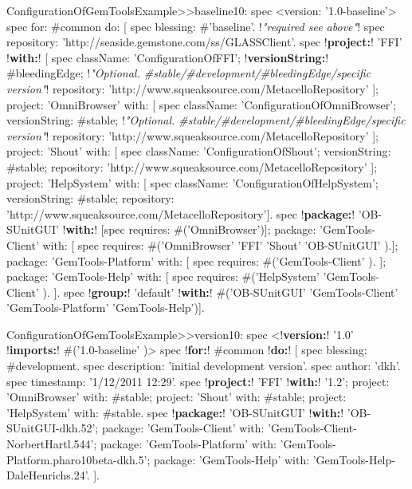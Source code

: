 \documentclass[a4paper,10pt,twoside]{book}
\begin{document}
\begin{footnotesize}
\begin{code}{}
ConfigurationOfGemToolsExample>>baseline10: spec
  <version: '1.0-baseline'>
  spec for: #common do: [
     spec blessing: #'baseline'.                 !\emph{"required see above"}!
     spec repository: 'http://seaside.gemstone.com/ss/GLASSClient'.
     spec
        !\textbf{project:}! 'FFI' !\textbf{with:}! [
          spec
             className: 'ConfigurationOfFFI';
             !\textbf{versionString:}! #bleedingEdge;					!\emph{"Optional. \#stable/\#development/\#bleedingEdge/specific version"}!
             repository: 'http://www.squeaksource.com/MetacelloRepository' ];
        project: 'OmniBrowser' with: [
          spec
             className: 'ConfigurationOfOmniBrowser';
             versionString: #stable;									!\emph{"Optional. \#stable/\#development/\#bleedingEdge/specific version"}!
             repository: 'http://www.squeaksource.com/MetacelloRepository' ];
        project: 'Shout' with: [
          spec
             className: 'ConfigurationOfShout';
             versionString: #stable;
             repository: 'http://www.squeaksource.com/MetacelloRepository' ];
        project: 'HelpSystem' with: [
          spec
             className: 'ConfigurationOfHelpSystem';
             versionString: #stable;
             repository: 'http://www.squeaksource.com/MetacelloRepository'].
     spec
        !\textbf{package:}! 'OB-SUnitGUI' !\textbf{with:}! [spec requires: #('OmniBrowser')];
        package: 'GemTools-Client' with: [ spec requires: #('OmniBrowser' 'FFI' 'Shout' 'OB-SUnitGUI' ).];
        package: 'GemTools-Platform' with: [ spec requires: #('GemTools-Client' ). ];
        package: 'GemTools-Help' with: [
          spec requires: #('HelpSystem' 'GemTools-Client' ). ].
     spec !\textbf{group:}! 'default' !\textbf{with:}! #('OB-SUnitGUI' 'GemTools-Client' 'GemTools-Platform' 'GemTools-Help')].
\end{code}
\end{footnotesize}







\begin{footnotesize}
\begin{code}{}
ConfigurationOfGemToolsExample>>version10: spec
     <!\textbf{version:}! '1.0' !\textbf{imports:}! #('1.0-baseline' )>
     spec !\textbf{for:}! #common !\textbf{do:}! [
          spec blessing: #development.
          spec description: 'initial development version'.
          spec author: 'dkh'.
          spec timestamp: '1/12/2011 12:29'.
     spec
          !\textbf{project:}! 'FFI' !\textbf{with:}! '1.2';
          project: 'OmniBrowser' with: #stable;
          project: 'Shout' with: #stable;
          project: 'HelpSystem' with: #stable.
     spec
          !\textbf{package:}! 'OB-SUnitGUI' !\textbf{with:}! 'OB-SUnitGUI-dkh.52';
          package: 'GemTools-Client' with: 'GemTools-Client-NorbertHartl.544';
          package: 'GemTools-Platform' with: 'GemTools-Platform.pharo10beta-dkh.5';
          package: 'GemTools-Help' with: 'GemTools-Help-DaleHenrichs.24'. ].
\end{code}
\end{footnotesize}
\end{document}
